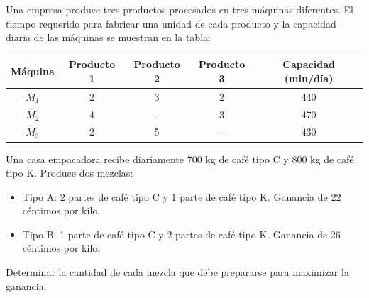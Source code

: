 \begin{Ejer}

Una empresa produce tres productos procesados en tres m\'aquinas diferentes. El tiempo requerido para fabricar una unidad de cada producto y la capacidad diaria de las m\'aquinas se muestran en la tabla:

\begin{center}
\begin{tabular}{|c|c|c|c|c|}
\hline
\textbf{M\'aquina} & Producto 1 & Producto 2 & Producto 3 & \textbf{Capacidad (min/d\'ia)} \\
\hline
$M_1$ & 2 & 3 & 2 & 440 \\
$M_2$ & 4 & - & 3 & 470 \\
$M_3$ & 2 & 5 & - & 430 \\
\hline
\end{tabular}
\end{center}
\end{Ejer}


\begin{Ejer}

Una casa empacadora recibe diariamente 700 kg de caf\'e tipo C y 800 kg de caf\'e tipo K. Produce dos mezclas:

\begin{itemize}
\item Tipo A: 2 partes de caf\'e tipo C y 1 parte de caf\'e tipo K. Ganancia de 22 c\'entimos por kilo.
\item Tipo B: 1 parte de caf\'e tipo C y 2 partes de caf\'e tipo K. Ganancia de 26 c\'entimos por kilo.
\end{itemize}

Determinar la cantidad de cada mezcla que debe prepararse para maximizar la ganancia.
\end{Ejer}

